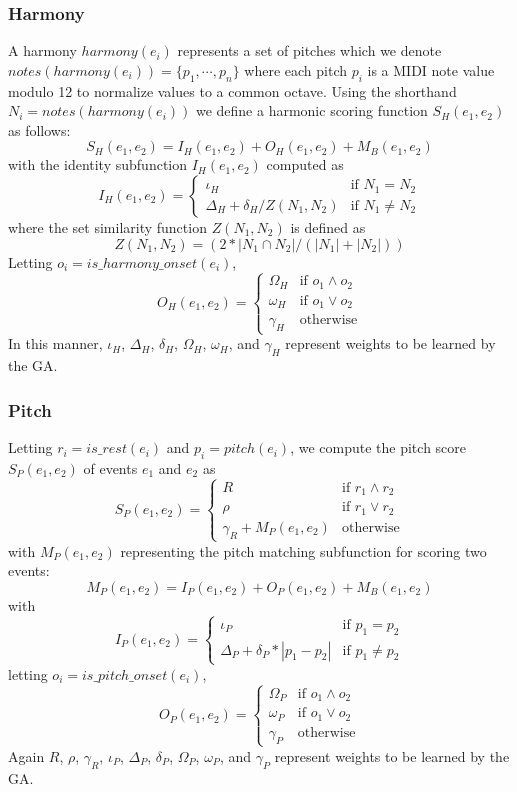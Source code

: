 \documentclass[phd,electronic,oneside,twosidetoc,letterpaper,chaptercenter,parttop,lol,lof,lot]{byumsphd}
\begin{document}
\subsubsection{Harmony}

A harmony $harmony(e_i)$ represents a set of pitches which we denote $notes(harmony(e_i)) = \{p_1,\cdots,p_n\}$ where each pitch $p_i$ is a MIDI note value modulo 12 to normalize values to a common octave. Using the shorthand $N_i = notes(harmony(e_i))$ we define a harmonic scoring function $S_H(e_1,e_2)$ as follows:
\[
  S_H(e_1,e_2) = I_H(e_1,e_2) + O_H(e_1,e_2) + M_B(e_1,e_2)
\]
\noindent with the identity subfunction $I_H(e_1,e_2)$ computed as
\[ I_H(e_1,e_2) = 
  \begin{cases}
  	\iota_H & \text{if } N_1 = N_2 \\
    \Delta_H + \delta_H/ Z(N_1,N_2) & \text{if } N_1 \neq N_2
  \end{cases}
\]
\noindent where the set similarity function $Z(N_1,N_2)$ is defined as
\[
Z(N_1,N_2) = (2*|N_1\cap N_2|/(|N_1|+|N_2|))
\]
\noindent Letting $o_i = is\_harmony\_onset(e_i)$,
\[ O_H(e_1,e_2) = 
  \begin{cases}
  	\Omega_H & \text{if } o_1 \land o_2 \\
    \omega_H & \text{if } o_1 \lor o_2 \\
    \gamma_H & \text{otherwise}
  \end{cases}
\]
\noindent In this manner, $\iota_H$, $\Delta_H$, $\delta_H$, $\Omega_H$, $\omega_H$, and $\gamma_H$ represent weights to be learned by the GA.

\subsubsection{Pitch}

Letting $r_i = is\_rest(e_i)$ and $p_i = pitch(e_i)$, we compute the pitch score $S_P(e_1,e_2)$ of events $e_1$ and $e_2$ as 
\[
S_P(e_1,e_2) =
  \begin{cases}
	R & \text{if } r_1 \land r_2 \\
	\rho & \text{if } r_1 \lor r_2 \\ 
    \gamma_R + M_P(e_1,e_2) & \text{otherwise}
  \end{cases}
\]
\noindent with $M_P(e_1,e_2)$ representing the pitch matching subfunction for scoring two events:
\[ M_P(e_1,e_2) = I_P(e_1,e_2) + O_P(e_1,e_2) + M_B(e_1,e_2) \]
\noindent with
\[ I_P(e_1,e_2) = 
  \begin{cases}
  	\iota_P & \text{if } p_1 = p_2 \\
    \Delta_P + \delta_P * |p_1-p_2| & \text{if } p_1 \neq p_2
  \end{cases}
\]
\noindent letting $o_i = is\_pitch\_onset(e_i)$,
\[ O_P(e_1,e_2) = 
  \begin{cases}
  	\Omega_P & \text{if } o_1 \land o_2 \\
    \omega_P & \text{if } o_1 \lor o_2 \\
    \gamma_P & \text{otherwise}
  \end{cases}
\]
\noindent Again $R$, $\rho$, $\gamma_R$, $\iota_P$, $\Delta_P$, $\delta_P$, $\Omega_P$, $\omega_P$, and $\gamma_P$ represent weights to be learned by the GA.
\end{document}
